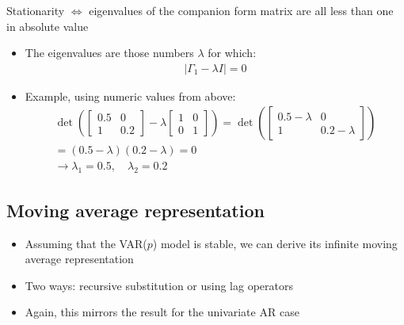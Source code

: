 \documentclass[10pt]{article}
\begin{document}
Stationarity $\iff $ eigenvalues of the companion form matrix are all less than one in absolute value 
\begin{itemize}
    \item The eigenvalues are those numbers $\lambda $ for which: 
    \begin{gather*}
        |\Gamma_1 - \lambda I| = 0
    \end{gather*}
    \item Example, using numeric values from above: 
    \begin{gather*}
        \det\left(
            \begin{bmatrix}
                0.5 & 0 \\
                1 & 0.2
            \end{bmatrix}
            -\lambda
            \begin{bmatrix}
                1 & 0 \\
                0 & 1
            \end{bmatrix}
        \right)
        = \det \left(
            \begin{bmatrix}
                0.5 - \lambda & 0 \\ 
                1 & 0.2 - \lambda
            \end{bmatrix}
        \right)\\
        = (0.5 - \lambda)(0.2 - \lambda) = 0\\
        \to \lambda_1 = 0.5, \quad\lambda_2 = 0.2
    \end{gather*}
\end{itemize}
\newpage 
\subsection{Moving average representation}
\begin{itemize}
    \item Assuming that the VAR($p $) model is stable, we can derive its infinite moving average representation
    \item Two ways: recursive substitution or using lag operators 
    \item Again, this mirrors the result for the univariate AR case 
\end{itemize}
\end{document}
